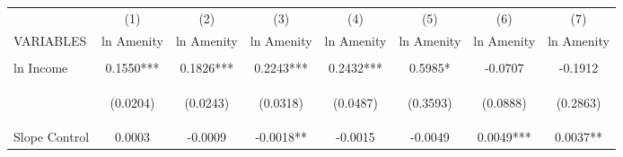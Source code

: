

\begin{tabular}{lccccccc} \hline
 & (1) & (2) & (3) & (4) & (5) & (6) & (7) \\
VARIABLES & ln Amenity & ln Amenity & ln Amenity & ln Amenity & ln Amenity & ln Amenity & ln Amenity \\ \hline
\vspace{4pt} & \begin{footnotesize}\end{footnotesize} & \begin{footnotesize}\end{footnotesize} & \begin{footnotesize}\end{footnotesize} & \begin{footnotesize}\end{footnotesize} & \begin{footnotesize}\end{footnotesize} & \begin{footnotesize}\end{footnotesize} & \begin{footnotesize}\end{footnotesize} \\
ln Income & 0.1550*** & 0.1826*** & 0.2243*** & 0.2432*** & 0.5985* & -0.0707 & -0.1912 \\
\vspace{4pt} & \begin{footnotesize}(0.0204)\end{footnotesize} & \begin{footnotesize}(0.0243)\end{footnotesize} & \begin{footnotesize}(0.0318)\end{footnotesize} & \begin{footnotesize}(0.0487)\end{footnotesize} & \begin{footnotesize}(0.3593)\end{footnotesize} & \begin{footnotesize}(0.0888)\end{footnotesize} & \begin{footnotesize}(0.2863)\end{footnotesize} \\
Slope Control & 0.0003 & -0.0009 & -0.0018** & -0.0015 & -0.0049 & 0.0049*** & 0.0037** \\

\end{tabular}
